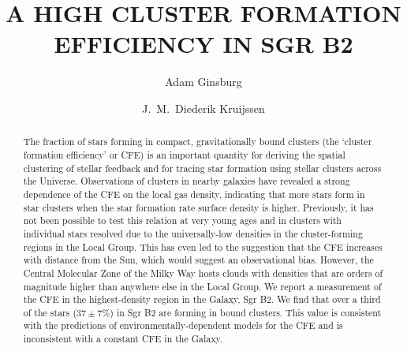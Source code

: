 \documentclass[twocolumn]{aastex62}
\begin{document}
\title{A HIGH CLUSTER FORMATION EFFICIENCY IN SGR B2}


\author[0000-0001-6431-9633]{Adam Ginsburg}

\author[0000-0002-8804-0212]{J.~M.\ Diederik Kruijssen}



\begin{abstract}
    The fraction of stars forming in compact, gravitationally bound clusters
    (the `cluster formation efficiency' or CFE) is an important quantity for
    deriving the spatial clustering of stellar feedback and for tracing star
    formation using stellar clusters across the Universe.  Observations of
    clusters in nearby galaxies have revealed a strong dependence of the CFE on
    the local gas density, indicating that more stars form in star clusters
    when the star formation rate surface density is higher. Previously, it has
    not been possible to test this relation at very young ages and in clusters
    with individual stars resolved due to the universally-low densities in the
    cluster-forming regions in the Local Group. This has even led to the
    suggestion that the CFE increases with distance from the Sun, which would
    suggest an observational bias.  However, the Central Molecular Zone of the
    Milky Way hosts clouds with densities that are orders of magnitude higher
    than anywhere else in the Local Group.  We report a measurement of the CFE
    in the highest-density region in the Galaxy, Sgr B2.  We find that over a
    third of the stars ($37\pm7\%$)  in Sgr B2 are forming in bound clusters.
    This value is consistent with the predictions of environmentally-dependent
    models for the CFE and is inconsistent with a constant CFE in the
    Galaxy.
    \vspace{10mm}
\end{abstract}
\end{document}
